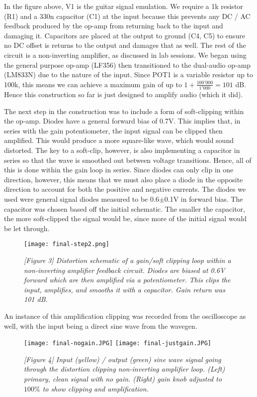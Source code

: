 \documentclass[11pt]{article}
\begin{document}
In the figure above, V1 is the guitar signal emulation. We require a 1k resistor (R1) and a 330n capacitor (C1) at the input because this prevents any DC / AC feedback produced by the op-amp from returning back to the input and damaging it. Capacitors are placed at the output to ground (C4, C5) to ensure no DC offset is returns to the output and damages that as well. The rest of the circuit is a non-inverting amplifier, as discussed in lab sessions. We began using the general purpose op-amp (LF356) then transitioned to the dual-audio op-amp (LM833N) due to the nature of the input. Since POT1 is a variable resistor up to 100k, this means we can achieve a maximum gain of up to $1 + \frac{100'000}{1'000} = 101$ dB. Hence this construction so far is just designed to amplify audio (which it did). 

The next step in the construction was to include a form of soft-clipping within the op-amp. Diodes have a general forward bias of 0.7V. This implies that, in series with the gain potentiometer, the input signal can be clipped then amplified. This would produce a more square-like wave, which would sound distorted. The key to a soft-clip, however, is also implementing a capacitor in series so that the wave is smoothed out between voltage transitions. Hence, all of this is done within the gain loop in series. Since diodes can only clip in one direction, however, this means that we must also place a diode in the opposite direction to account for both the positive and negative currents. The diodes we used were general signal diodes measured to be 0.6$\pm$0.1V in forward bias. The capacitor was chosen based off the initial schematic. The smaller the capacitor, the more soft-clipped the signal would be, since more of the initial signal would be let through. 

\begin{figure}[H]
    \centering
    \texttt{[image: final-step2.png]}
    \caption*{\textit{[Figure 3] Distortion schematic of a gain/soft clipping loop within a non-inverting amplifier feedback circuit. Diodes are biased at 0.6V forward which are then amplified via a potentiometer. This clips the input, amplifies, and smooths it with a capacitor. Gain return was 101 dB.}}
\end{figure}

An instance of this amplification clipping was recorded from the oscilloscope as well, with the input being a direct sine wave from the wavegen. 

\begin{figure}[H]
    \centering
    \texttt{[image: final-nogain.JPG]}
    \texttt{[image: final-justgain.JPG]}
    \caption*{\textit{[Figure 4] Input (yellow) / output (green) sine wave signal going through the distortion clipping non-inverting amplifier loop. (Left) primary, clean signal with no gain. (Right) gain knob adjusted to $100\%$ to show clipping and amplification.}}
\end{figure}
\end{document}
